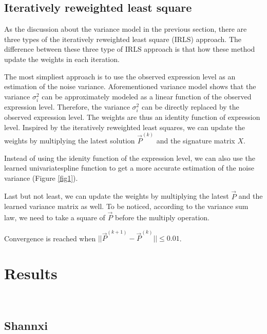 \documentclass[10pt, a4paper, oneside]{article}
\begin{document}
\subsection{Iteratively reweighted least square}
\justify
As the discussion about the variance model in the previous section, there are three types of the iteratively
reweighted least square (IRLS) approach. The difference between these three type of IRLS approach is that how these
method update the weights in each iteration.

The most simpliest approach is to use the observed expression level as an estimation of the noise variance.
Aforementioned variance model shows that the variance $\sigma_i^2$ can be approximately modeled as a linear function of the observed expression level. 
Therefore, the variance $\sigma_i^2$ can be directly replaced by the observed expression level. The weights are thus an identity function of
expression level. Inspired by the iteratively reweighted least squares, we can update the weights by multiplying the latest solution $\vec{P}^{(k)}$ and the signature matrix $X$.

Instead of using the idenity function of the expression level, we can also use the learned univariatespline function to get a more accurate estimation
of the noise variance (Figure \ref{fig1}). 

Last but not least, we can update the weights by multiplying the latest $\vec{P}$ and the learned variance matrix as well.
To be noticed, according to the variance sum law, we need to take a square of $\vec{P}$ before the multiply operation.
 

Convergence is reached when $||\vec{P}^{(k+1)} - \vec{P}^{(k)}|| \leq 0.01$.



\section{Results}  %
\subsection{Shannxi}  %
\subsection{}

\medskip



\end{document}
